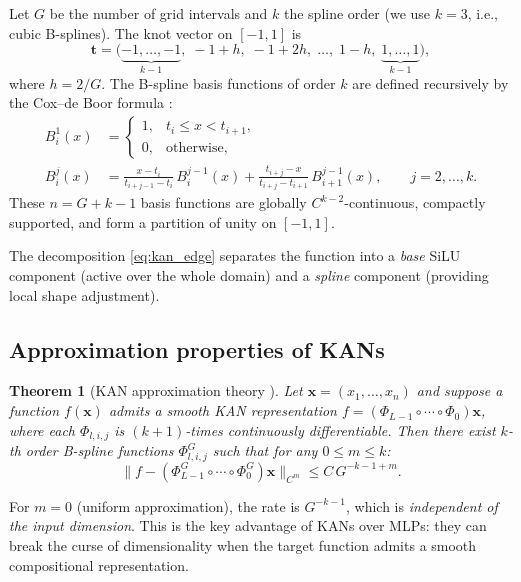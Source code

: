 \documentclass[11pt]{article}
\newtheorem{theorem}{Theorem}[section]
\theoremstyle{remark}
\begin{document}
Let $G$ be the number of grid intervals and $k$ the spline order (we use $k = 3$, i.e., cubic B-splines). The knot vector on $[-1,1]$ is
\begin{equation}
\mathbf{t} = \bigl(\underbrace{-1,\ldots,-1}_{k-1},\; -1+h,\; -1+2h,\; \ldots,\; 1-h,\; \underbrace{1,\ldots,1}_{k-1}\bigr),
\end{equation}
where $h = 2/G$. The B-spline basis functions of order $k$ are defined recursively by the Cox--de Boor formula \cite{de1978practical,piegl1997nurbs}:
\begin{align}
B_i^1(x) &=
\begin{cases}
1, & t_i \leq x < t_{i+1},\\
0, & \text{otherwise},
\end{cases}\\
B_i^j(x) &=
\frac{x - t_i}{t_{i+j-1} - t_i}\,B_i^{j-1}(x)
+ \frac{t_{i+j} - x}{t_{i+j} - t_{i+1}}\,B_{i+1}^{j-1}(x),
\qquad j = 2,\ldots,k.
\end{align}
These $n = G + k - 1$ basis functions are globally $C^{k-2}$-continuous, compactly supported, and form a partition of unity on $[-1,1]$.

The decomposition \eqref{eq:kan_edge} separates the function into a \emph{base} SiLU component (active over the whole domain) and a \emph{spline} component (providing local shape adjustment).

\subsection{Approximation properties of KANs}

\begin{theorem}[KAN approximation theory \cite{liu2024kan}]
\label{thm:KAT_approx}
Let $\mathbf{x} = (x_1,\ldots,x_n)$ and suppose a function $f(\mathbf{x})$ admits a smooth KAN representation
$f = (\Phi_{L-1} \circ \cdots \circ \Phi_0)\mathbf{x}$,
where each $\Phi_{l,i,j}$ is $(k+1)$-times continuously differentiable. Then there exist $k$-th order B-spline functions $\Phi_{l,i,j}^G$ such that for any $0 \leq m \leq k$:
\begin{equation}\label{eq:KAT_bound}
\bigl\|f - (\Phi^G_{L-1} \circ \cdots \circ \Phi^G_0)\mathbf{x}\bigr\|_{C^m} \leq C\,G^{-k-1+m}.
\end{equation}
\end{theorem}

For $m = 0$ (uniform approximation), the rate is $G^{-k-1}$, which is \emph{independent of the input dimension}. This is the key advantage of KANs over MLPs: they can break the curse of dimensionality when the target function admits a smooth compositional representation.
\end{document}
